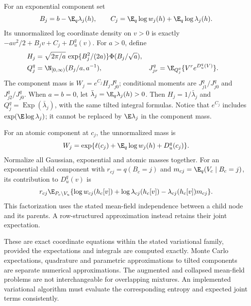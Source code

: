 For an exponential component set
\begin{equation}\label{eq:expviAB}
B_j=b-\E_q\lambda_j(h),\qquad
C_j=\E_q\log w_j(h)+\E_q\log\lambda_j(h).
\end{equation}
Its unnormalized log coordinate density on \(v>0\) is exactly
\(-av^2/2+B_jv+C_j+D_u^q(v)\).
For \(a>0\), define
\begin{align}
H_j&=\sqrt{2\pi/a}\,
       \exp\{B_j^2/(2a)\}\Phi(B_j/\sqrt a),\\
Q_j^q&=\N_{[0,\infty)}(B_j/a,a^{-1}),&
J_{jr}^q&=\E_{Q_j^q}\{V^r e^{D_u^q(V)}\}.
\end{align}
The component mass is \(W_j=e^{C_j}H_jJ_{j0}^q\); conditional moments
are \(J_{j1}^q/J_{j0}^q\) and \(J_{j2}^q/J_{j0}^q\).
When \(a=b=0\), let \(\bar\lambda_j=\E_q\lambda_j(h)>0\).
Then \(H_j=1/\bar\lambda_j\) and
\(Q_j^q=\operatorname{Exp}(\bar\lambda_j)\), with the same tilted
integral formulas. Notice that \(e^{C_j}\) includes
\(\exp(\E\log\lambda_j)\); it cannot be replaced by
\(\E\lambda_j\) in the component mass.

For an atomic component at \(c_j\), the unnormalized mass is
\[
W_j=\exp\{\ell(c_j)+\E_q\log w_j(h)+D_u^q(c_j)\}.
\]
Normalize all Gaussian, exponential and atomic masses together.
For an exponential child component with
\(r_{cj}=q(B_c=j)\) and
\(m_{cj}=\E_q(V_c\mid B_c=j)\), its contribution to \(D_u^q(v)\) is
\begin{equation}\label{eq:expvichild}
r_{cj}\E_{P_c\setminus V_u}
\{\log w_{cj}(h_c[v])+\log\lambda_{cj}(h_c[v])
                    -\lambda_{cj}(h_c[v])m_{cj}\}.
\end{equation}
This factorization uses the stated mean-field independence between a
child node and its parents. A row-structured approximation instead retains
their joint expectation.

These are exact coordinate equations within the stated variational family,
provided the expectations and integrals are computed exactly. Monte Carlo
expectations, quadrature and parametric approximations to tilted components
are separate numerical approximations. The augmented and collapsed
mean-field problems are not interchangeable for overlapping mixtures.
An implemented variational algorithm must evaluate the corresponding
entropy and expected joint terms consistently.

